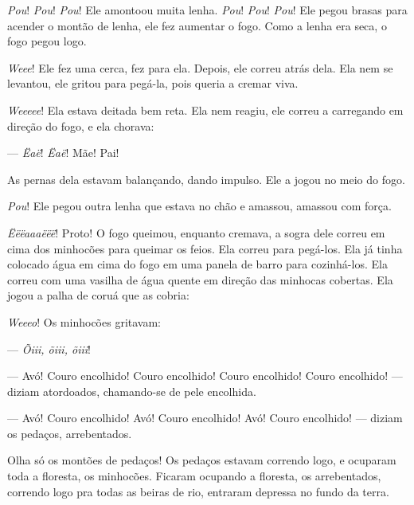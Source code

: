 

\textit{Pou}! \textit{Pou}! \textit{Pou}! Ele amontoou muita lenha. \textit{Pou}! \textit{Pou}! \textit{Pou}! Ele pegou
brasas para acender o montão de lenha, ele fez aumentar o fogo. Como a
lenha era seca, o fogo pegou logo. 

\textit{Weee}! Ele fez uma cerca, fez para ela. Depois, ele correu atrás dela.
Ela nem se levantou, ele gritou para pegá-la, pois queria a cremar viva. 

\textit{Weeeee}! Ela estava deitada bem reta. Ela nem reagiu, ele correu a carregando
em direção do fogo, e ela chorava: 

--- \textit{Ëaë}! \textit{Ëaë}! Mãe! Pai! 

As pernas dela estavam balançando, dando impulso. Ele a jogou no meio
do fogo. 

\textit{Pou}! Ele pegou outra lenha que estava no chão e amassou, amassou com
força. 

\textit{Ëëëaaaëëë}! Proto! O fogo queimou, enquanto cremava, a sogra dele correu
em cima dos minhocões para queimar os feios. Ela correu para pegá-los.
Ela já tinha colocado água em cima do fogo em uma panela de barro para
cozinhá-los. Ela correu com uma vasilha de água quente em direção das
minhocas cobertas. Ela jogou a palha de coruá que as cobria: 

\textit{Weeeo}! Os minhocões gritavam:

--- \textit{Õiii, õiii, õiii}! 

--- Avó! Couro encolhido! Couro encolhido! Couro encolhido! Couro
 encolhido! --- diziam atordoados, chamando-se de pele encolhida. 

--- Avó! Couro encolhido! Avó! Couro encolhido! Avó! Couro encolhido! ---
diziam os pedaços, arrebentados. 

Olha só os montões de pedaços! Os pedaços estavam correndo logo, e
ocuparam toda a floresta, os minhocões. Ficaram ocupando a floresta, os
arrebentados, correndo logo pra todas as beiras de rio, entraram depressa
no fundo da terra. 

